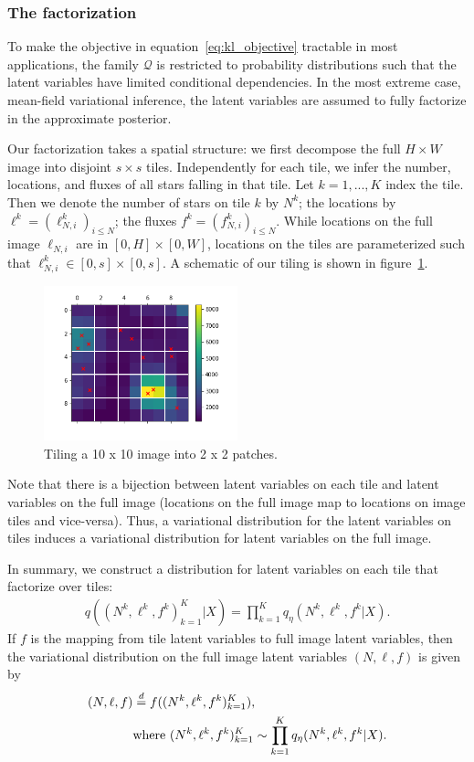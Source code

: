 \subsubsection{The factorization}
To make the objective in equation~\ref{eq:kl_objective} tractable in most 
applications, the family $\mathcal{Q}$ is restricted to probability distributions 
such that the latent variables have limited conditional dependencies. In the most extreme case, mean-field variational inference, the latent variables are assumed to fully factorize in the approximate posterior. 

Our factorization takes a spatial structure: we first decompose the full 
$H \times W$ image into disjoint $s \times s$ tiles. 
Independently for each tile,
we infer the number, locations, and fluxes of all stars falling in that tile.
Let $k = 1, ..., K$ index the tile. Then we
denote the number of stars on tile $k$ by $N^k$;
the locations by $\ell^k = (\ell_{N, i}^k)_{i \leq N}$; 
the fluxes $f^k = (f_{N, i}^k)_{i \leq N}$. While locations on the 
full image $\ell_{N, i}$ are in $[0, H] \times [0, W]$, 
locations on the tiles are parameterized such that 
$\ell^k_{N, i}\in[0, s] \times [0, s]$. A schematic 
of our tiling is shown in figure~\ref{fig:ex_tiles}. 

\begin{figure}
    \centering
    \includegraphics[width = 0.5\textwidth]{figures/example_tiled.png}
    \caption{Tiling a 10 x 10 image into 2 x 2 patches. }
    \label{fig:ex_tiles}
\end{figure}

Note that there is a bijection between latent variables on each tile and latent variables on the full image (locations on the full image map to locations on image tiles and vice-versa). Thus, a variational distribution for the latent variables on tiles induces a variational distribution for latent variables on the full image. 

In summary, we construct a distribution for latent variables on each tile that factorize over tiles: 
\begin{align}
    q((N^k, \ell^k, f^k)_{k = 1}^K|X) = \prod_{k = 1}^K q_\eta(N^k, \ell^k, f^k | X). 
\end{align}
If $f$ is the mapping from tile latent variables to full image latent variables, 
then the variational distribution on the full image latent variables 
$(N, \ell, f)$ is given by 
\begin{align}
    (N, \ell, f) &\stackrel{d}{=} f((N^k, \ell^k, f^k)_{k = 1}^K), \notag \\  
        &\text{where } (N^k, \ell^k, f^k)_{k = 1}^K \sim \prod_{k = 1}^K q_\eta(N^k, \ell^k, f^k | X). 
\end{align}

